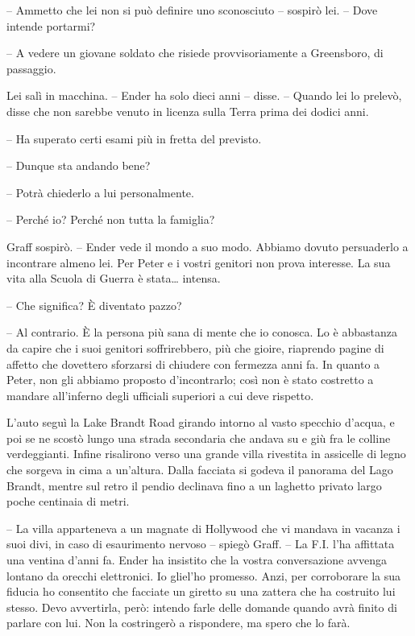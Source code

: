 {-- Ammetto che lei non si può definire uno sconosciuto -- sospirò lei.
	-- Dove intende portarmi?}

{-- A vedere un giovane soldato che risiede provvisoriamente a
	Greensboro, di passaggio.}

{Lei salì in macchina. -- Ender ha solo dieci anni -- disse. -- Quando
	lei lo prelevò, disse che non sarebbe venuto in licenza sulla Terra
	prima dei dodici anni.}

{-- Ha superato certi esami più in fretta del previsto.}

{-- Dunque sta andando bene?}

{-- Potrà chiederlo a lui personalmente.}

{-- Perché io? Perché non tutta la famiglia?}

{Graff sospirò. -- Ender vede il mondo a suo modo. Abbiamo dovuto
	persuaderlo a incontrare almeno lei. Per Peter e i vostri genitori non
	prova interesse. La sua vita alla Scuola di Guerra è stata\ldots{}
	intensa.}

{-- Che significa? È diventato pazzo?}

{-- Al contrario. È la persona più sana di mente che io conosca. Lo è
	abbastanza da capire che i suoi genitori soffrirebbero, più che gioire,
	riaprendo pagine di affetto che dovettero sforzarsi di chiudere con
	fermezza anni fa. In quanto a Peter, non gli abbiamo proposto
	d'incontrarlo; così non è stato costretto a mandare all'inferno degli
	ufficiali superiori a cui deve rispetto.}

{L'auto seguì la Lake Brandt Road girando intorno al vasto specchio
	d'acqua, e poi se ne scostò lungo una strada secondaria che andava su e
	giù fra le colline verdeggianti. Infine risalirono verso una grande
	villa rivestita in assicelle di legno che sorgeva in cima a un'altura.
	Dalla facciata si godeva il panorama del Lago Brandt, mentre sul retro
	il pendio declinava fino a un laghetto privato largo poche centinaia di
	metri.}

{-- La villa apparteneva a un magnate di Hollywood che vi mandava in
	vacanza i suoi divi, in caso di esaurimento nervoso -- spiegò Graff. --
	La F.I. l'ha affittata una ventina d'anni fa. Ender ha insistito che la
	vostra conversazione avvenga lontano da orecchi elettronici. Io gliel'ho
	promesso. Anzi, per corroborare la sua fiducia ho consentito che
	facciate un giretto su una zattera che ha costruito lui stesso. Devo
	avvertirla, però: intendo farle delle domande quando avrà finito di
	parlare con lui. Non la costringerò a rispondere, ma spero che lo farà.}


